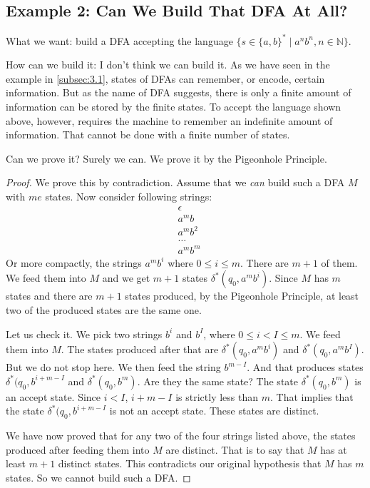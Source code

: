 \documentclass[11pt]{article}
\begin{document}
\subsection{Example 2: Can We Build That DFA At All?}

What we want: build a DFA accepting the language $\{s \in \{a,b\}^\ast \mid a^nb^n
, n \in \mathbb{N}\}$.

How can we build it: I don't think we can build it. As we have seen in the example
in \ref{subsec:3.1}, states of DFAs can remember, or encode, certain information.
But as the name of DFA suggests, there is only a finite amount of information can
be stored by the finite states. To accept the language shown above, however, requires
the machine to remember an indefinite amount of information. That cannot be done
with a finite number of states.

Can we prove it? Surely we can. We prove it by the Pigeonhole Principle.

\begin{proof}
We prove this by contradiction. Assume that we \emph{can} build such a DFA $M$ with
$me$ states. Now consider following strings:
\begin{align*}
&\epsilon \\
&a^mb \\
&a^mb^2 \\
&\dots \\
&a^mb^m
\end{align*}
Or more compactly, the strings $a^mb^i$ where $0 \leq i \leq m$. There are $m + 1$ of
them. We feed them into $M$ and we get $m + 1$ states $\delta ^ \ast(q_0, a^mb^i)$.
Since $M$ has $m$ states and there are $m + 1$ states produced, by the Pigeonhole
Principle, at least two of the produced states are the same one.

Let us check it. We pick two strings $b^i$ and $b^I$, where $0 \leq i < I \leq m$. We
feed them into $M$. The states produced after that are $\delta ^ \ast(q_0, a^mb^i)$
and $\delta ^ \ast(q_0, a^mb^I)$. But we do not stop here. We then feed the string
$b^{m-I}$. And that produces states $\delta ^ \ast(q_0, b^{i + m - I}$ and
$\delta ^ \ast(q_0, b^m)$. Are they the same state? The state
$\delta ^ \ast(q_0, b^m)$ is an accept state. Since $i < I$, $i + m - I$ is
strictly less than $m$. That implies that the state
$\delta ^ \ast(q_0, b^{i + m - I}$ is not an accept state. These states are
distinct.

We have now proved that for any two of the four strings listed above, the states
produced after feeding them into $M$ are distinct. That is to say that $M$ has at
least $m + 1$ distinct states. This contradicts our original hypothesis that $M$ has
$m$ states. So we cannot build such a DFA.
\end{proof}
\end{document}
